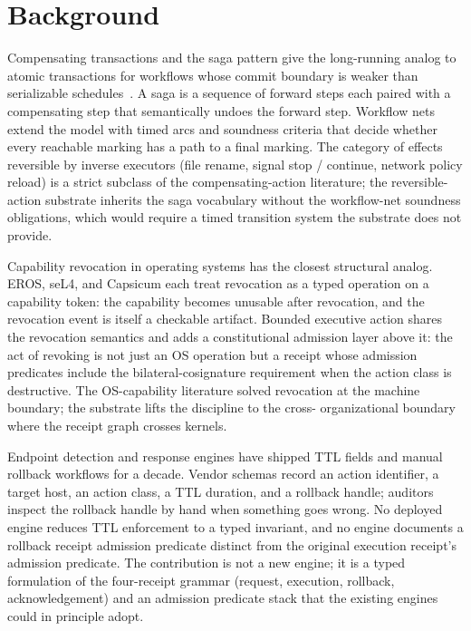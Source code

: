 \section{Background}
\label{sec:background-ra}

Compensating transactions and the saga pattern give the long-running
analog to atomic transactions for workflows whose commit boundary is
weaker than serializable schedules~\cite{TODO_bea_bib}. A saga is a
sequence of forward steps each paired with a compensating step that
semantically undoes the forward step. Workflow nets extend the model
with timed arcs and soundness criteria that decide whether every
reachable marking has a path to a final marking. The category of effects
reversible by inverse executors (file rename, signal stop / continue,
network policy reload) is a strict subclass of the compensating-action
literature; the reversible-action substrate inherits the saga
vocabulary without the workflow-net soundness obligations, which would
require a timed transition system the substrate does not provide.

Capability revocation in operating systems has the closest structural
analog. EROS, seL4, and Capsicum each treat revocation as a typed
operation on a capability token: the capability becomes unusable after
revocation, and the revocation event is itself a checkable artifact.
Bounded executive action shares the revocation semantics and adds a
constitutional admission layer above it: the act of revoking is not
just an OS operation but a receipt whose admission predicates include
the bilateral-cosignature requirement when the action class is
destructive. The OS-capability literature solved revocation at the
machine boundary; the substrate lifts the discipline to the cross-
organizational boundary where the receipt graph crosses kernels.

Endpoint detection and response engines have shipped TTL fields and
manual rollback workflows for a decade. Vendor schemas record an action
identifier, a target host, an action class, a TTL duration, and a
rollback handle; auditors inspect the rollback handle by hand when
something goes wrong. No deployed engine reduces TTL enforcement to a
typed invariant, and no engine documents a rollback receipt admission
predicate distinct from the original execution receipt's admission
predicate. The contribution is not a new engine; it is a typed
formulation of the four-receipt grammar (request, execution, rollback,
acknowledgement) and an admission predicate stack that the existing
engines could in principle adopt.

